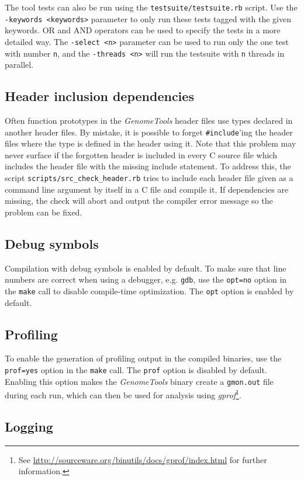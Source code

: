 \documentclass[11pt,final]{article}
\newcommand{\keyword}[1]{\lstinline{#1}}
\newcommand{\Gt}[0]{\emph{GenomeTools}\xspace}
\begin{document}
The tool tests can also be run using the \keyword{testsuite/testsuite.rb}
script. Use the \keyword{-keywords <keywords>} parameter to only run these
tests tagged with the given keywords. OR and AND operators can be used to
specify the tests in a more detailed way. The \keyword{-select <n>} parameter
can be used to run only the one test with number \keyword{n}, and the
\keyword{-threads <n>} will run the testsuite with \keyword{n} threads in
parallel.

\subsection{Header inclusion dependencies}
Often function prototypes in the \Gt header files use types declared in
another header files. By mistake, it is possible to forget
\keyword{#include}'ing the header files where the type is defined in the header
using it. Note that this problem may never surface if the forgotten header
is included in every C source file which includes the header file with the
missing include statement. To address this, the script
\keyword{scripts/src_check_header.rb} tries to include each header file given
as a command line argument by itself in a C file and compile it.
If dependencies are missing, the check will abort and output the compiler error
message so the problem can be fixed.

\subsection{Debug symbols}
Compilation with debug symbols is enabled by default.
To make sure that line numbers are correct when using a debugger, e.g.
\keyword{gdb}, use the \keyword{opt=no} option in the \keyword{make} call to
disable compile-time optimization. The \keyword{opt} option is enabled by
default.

\subsection{Profiling}
To enable the generation of profiling output in the compiled binaries, use the
\keyword{prof=yes} option in the \keyword{make} call. The \keyword{prof} option
is disabled by default. Enabling this option makes the \Gt binary create a
\keyword{gmon.out} file during each run, which can then be used for analysis
using \emph{gprof}\footnote{See
\url{http://sourceware.org/binutils/docs/gprof/index.html} for further
information.}.

\subsection{Logging}
\end{document}
